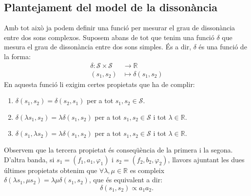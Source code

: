 \documentclass{article}
\theoremstyle{math}
\newcommand{\0}{\ensuremath{\vb{0}}}
\newcommand{\RR}{\ensuremath{\mathbb{R}}} %
\begin{document}
\subsection{Plantejament del model de la dissonància}
Amb tot això ja podem definir una funció per mesurar el grau de dissonància entre dos sons complexos. Suposem abans de tot que tenim una funció $\delta$ que mesura el grau de dissonància entre dos sons simples. És a dir, $\delta$ és una funció de la forma:
\begin{align*}
    \delta:\mathcal{S}\times\mathcal{S}&\longrightarrow\RR\\
    (s_1,s_2)&\longmapsto\delta(s_1,s_2)
\end{align*}
En aquesta funció li exigim certes propietats que ha de complir:
\begin{enumerate}[label=$\delta$\arabic*),ref=$\delta$\arabic*]
    \item\label{delta1} $\delta(s_1,s_2)=\delta(s_2,s_1)$ per a tot $s_1,s_2\in\mathcal{S}$.
    \item\label{delta2} $\delta(\lambda s_1,s_2)=\lambda\delta(s_1,s_2)$ per a tot $s_1,s_2\in\mathcal{S}$ i tot $\lambda\in\RR$.
    \item\label{delta3} $\delta(s_1,\lambda s_2)=\lambda\delta(s_1,s_2)$ per a tot $s_1,s_2\in\mathcal{S}$ i tot $\lambda\in\RR$.\par
\end{enumerate}
Observem que la tercera propietat és conseqüència de la primera i la segona. D'altra banda, si $s_1=(f_1,a_1,\varphi_1)$ i $s_2=(f_2,b_2,\varphi_2)$, llavors ajuntant les dues últimes propietats obtenim que $\forall\lambda,\mu\in\RR$ es compleix $\delta(\lambda s_1,\mu s_2)=\lambda\mu\delta(s_1,s_2)$, que és equivalent a dir: $$\delta(s_1,s_2)\propto a_1a_2.$$ 
\end{document}
